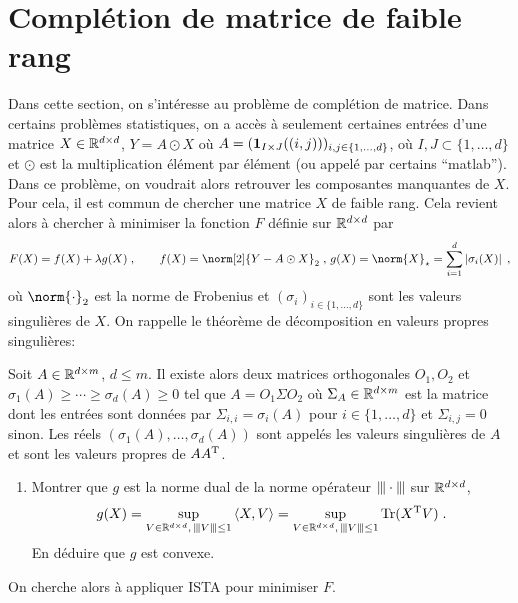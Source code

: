 \documentclass[a4paper,french,12pt]{article}
\begin{document}
\section{Complétion de matrice de faible rang}
\label{sec:minimisation-de-la}

Dans cette section, on s'intéresse au problème de complétion de
matrice. Dans certains problèmes statistiques, on a accès à seulement
certaines entrées d'une matrice $X \in \mathbb{R}^{d \times d}$,
$Y = A \odot X$ où
$A =(\mathbf 1_{I \times J}((i,j)))_{i,j \in \{1,\ldots,d\}}$, où
$I,J \subset \{1,\ldots,d\}$ et $\odot$ est la multiplication élément
par élément (ou appelé par certains ``matlab'').  Dans ce problème, on
voudrait alors retrouver les composantes manquantes de $X$. Pour cela,
il est commun de chercher une matrice $X$ de faible rang. Cela revient
alors à chercher à minimiser la fonction $F$ définie sur $\mathbb{R}^{d\times d}$ par
\begin{equation*}
  F(X) = f(X) + \lambda g(X) \eqsp, \qquad f(X) = \norm[2]{Y-A\odot X}_{2} \eqsp, \, g(X )= \norm{X}_{\star}  = \sum_{i=1}^d \abs{\sigma_i(X)}  \eqsp,
\end{equation*}
où $\norm{\cdot}_2$ est la norme de Frobenius et
$(\sigma_i)_{i \in \{1,\ldots,d\}}$ sont les valeurs singulières de
$X$. On rappelle le théorème de décomposition en valeurs propres
singulières:
\begin{theoreme}
  \label{theo:svd}
Soit $A \in \mathbb{R}^{d \times m}$, $d \leq m$. Il existe alors deux matrices orthogonales $O_1,O_2$ et $\sigma_1(A) \geq \cdots \geq \sigma_d(A) \geq 0$ tel que $A = O_1 \Sigma O_2$ où $\Sigma_A \in \mathbb{R}^{d \times m}$ est la matrice dont les entrées sont données par $\Sigma_{i,i} = \sigma_i(A)$ pour $i \in\{1,\ldots,d\}$ et $\Sigma_{i,j} = 0$ sinon.  Les réels $(\sigma_1(A), \ldots, \sigma_d(A))$ sont appelés les valeurs singulières de $A$ et sont les valeurs propres de $A A^{\mathrm{T}}$.  
\end{theoreme}
\begin{enumerate}
\item Montrer que $g$ est la norme dual de la norme opérateur $\Vert\hspace{-1pt}| \cdot \Vert\hspace{-1pt}|$ sur
  $\mathbb{R}^{d \times d}$, \ie
  \begin{equation*}
    g(X) = \sup_{V \in \mathbb{R}^{d \times d}, \, \Vert\hspace{-1pt}| V \Vert\hspace{-1pt}| \leq 1} \left\langle X,V \right\rangle = \sup_{V \in \mathbb{R}^{d \times d}, \, \Vert\hspace{-1pt}| V \Vert\hspace{-1pt}| \leq 1}\operatorname{Tr}(X^{\mathrm{T}}V) \;. 
  \end{equation*}
 En déduire que $g$ est convexe. 
\end{enumerate}
On cherche alors à appliquer ISTA pour minimiser $F$. 
\end{document}
